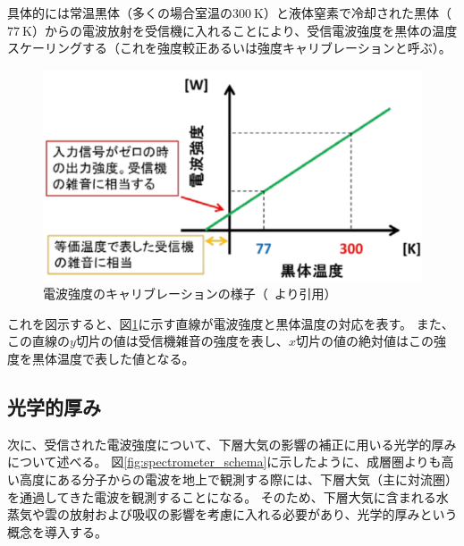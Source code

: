 具体的には常温黒体（多くの場合室温の$300\ \mathrm{K}$）と液体窒素で冷却された黒体（$77\ \mathrm{K}$）からの電波放射を受信機に入れることにより、受信電波強度を黒体の温度スケーリングする（これを強度較正あるいは強度キャリブレーションと呼ぶ）。
\begin{figure}[htbp]
    \centering
    \includegraphics[scale=0.6]{master_thesis_contents/master_thesis_fig/calibration.pdf}
    \caption{電波強度のキャリブレーションの様子（~\cite{ito2017master}より引用）}
    \label{fig:calibration}
\end{figure}
これを図示すると、図\ref{fig:calibration}に示す直線が電波強度と黒体温度の対応を表す。
また、この直線の$y$切片の値は受信機雑音の強度を表し、$x$切片の値の絶対値はこの強度を黒体温度で表した値となる。


\subsection{光学的厚み}
\label{subsec:opticaldepth}
次に、受信された電波強度について、下層大気の影響の補正に用いる光学的厚みについて述べる。
図\ref{fig:spectrometer_schema}に示したように、成層圏よりも高い高度にある分子からの電波を地上で観測する際には、下層大気（主に対流圏）を通過してきた電波を観測することになる。
そのため、下層大気に含まれる水蒸気や雲の放射および吸収の影響を考慮に入れる必要があり、光学的厚みという概念を導入する。\par

